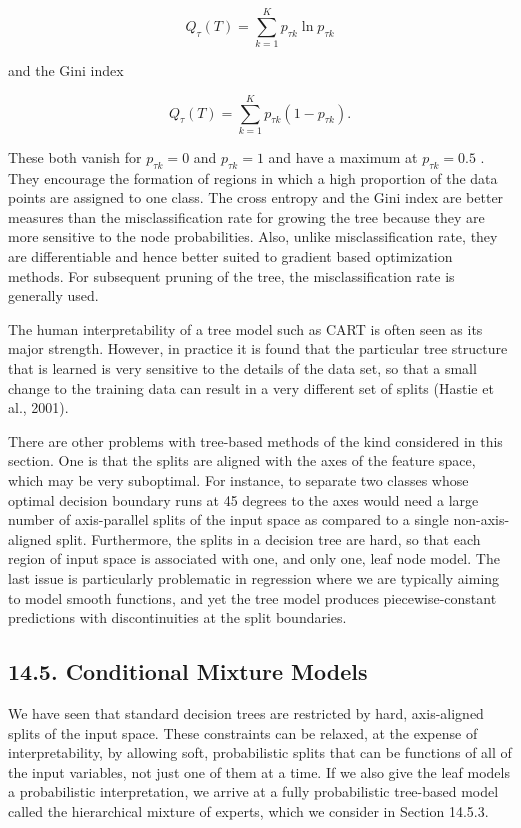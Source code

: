 \documentclass[
  10
]{article}
\begin{document}
\[
Q _ {\tau} (T) = \sum_ {k = 1} ^ {K} p _ {\tau k} \ln p _ {\tau k}\tag{14.32}
\]

and the Gini index

\[
Q _ {\tau} (T) = \sum_ {k = 1} ^ {K} p _ {\tau k} \left(1 - p _ {\tau k}\right).\tag{14.33}
\]

These both vanish for \(p _ { \tau k } = 0\) and \(p _ { \tau k } = 1\)
and have a maximum at \(p _ { \tau k } = 0 . 5\) . They encourage the
formation of regions in which a high proportion of the data points are
assigned to one class. The cross entropy and the Gini index are better
measures than the misclassification rate for growing the tree because
they are more sensitive to the node probabilities. Also, unlike
misclassification rate, they are differentiable and hence better suited
to gradient based optimization methods. For subsequent pruning of the
tree, the misclassification rate is generally used.

The human interpretability of a tree model such as CART is often seen as
its major strength. However, in practice it is found that the particular
tree structure that is learned is very sensitive to the details of the
data set, so that a small change to the training data can result in a
very different set of splits (Hastie et al., 2001).

There are other problems with tree-based methods of the kind considered
in this section. One is that the splits are aligned with the axes of the
feature space, which may be very suboptimal. For instance, to separate
two classes whose optimal decision boundary runs at 45 degrees to the
axes would need a large number of axis-parallel splits of the input
space as compared to a single non-axis-aligned split. Furthermore, the
splits in a decision tree are hard, so that each region of input space
is associated with one, and only one, leaf node model. The last issue is
particularly problematic in regression where we are typically aiming to
model smooth functions, and yet the tree model produces
piecewise-constant predictions with discontinuities at the split
boundaries.

\subsection{14.5. Conditional Mixture
Models}\label{conditional-mixture-models}

We have seen that standard decision trees are restricted by hard,
axis-aligned splits of the input space. These constraints can be
relaxed, at the expense of interpretability, by allowing soft,
probabilistic splits that can be functions of all of the input
variables, not just one of them at a time. If we also give the leaf
models a probabilistic interpretation, we arrive at a fully
probabilistic tree-based model called the hierarchical mixture of
experts, which we consider in Section 14.5.3.
\end{document}
